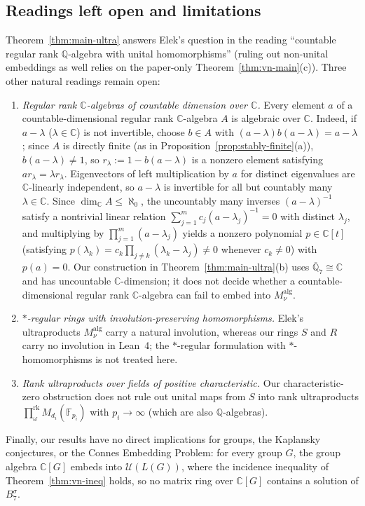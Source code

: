 \documentclass[11pt]{article}
\theoremstyle{definition}
\theoremstyle{remark}
\numberwithin{equation}{section}
\newcommand{\RUF}[3]{\prod_{#1}^{\mathrm{rk}} M_{#2}(#3)}
\newcommand{\Q}{\mathbb{Q}}
\newcommand{\C}{\mathbb{C}}
\newcommand{\F}{\mathbb{F}}
\newcommand{\U}{\mathcal{U}}
\newcommand{\1}{\mathbf{1}}
\begin{document}
\subsection{Readings left open and limitations}
\label{sec:open-readings}

Theorem~\ref{thm:main-ultra} answers Elek's question in the reading ``countable regular rank $\Q$-algebra with unital homomorphisms'' (ruling out non-unital embeddings as well relies on the paper-only Theorem~\ref{thm:vn-main}(c)). Three other natural readings remain open:
\begin{enumerate}[label=\textup{(\arabic*)},leftmargin=2.2em]
\item \emph{Regular rank $\C$-algebras of countable dimension over $\C$.} Every element $a$ of a countable-dimensional regular rank $\C$-algebra $A$ is algebraic over $\C$. Indeed, if $a - \lambda$ ($\lambda \in \C$) is not invertible, choose $b \in A$ with $(a - \lambda)b(a - \lambda) = a - \lambda$; since $A$ is directly finite (as in Proposition~\ref{prop:stably-finite}(a)), $b(a - \lambda) \neq 1$, so $r_\lambda := 1 - b(a - \lambda)$ is a nonzero element satisfying $a r_\lambda = \lambda r_\lambda$. Eigenvectors of left multiplication by $a$ for distinct eigenvalues are $\C$-linearly independent, so $a - \lambda$ is invertible for all but countably many $\lambda \in \C$. Since $\dim_\C A \le \aleph_0$, the uncountably many inverses $(a - \lambda)^{-1}$ satisfy a nontrivial linear relation $\sum_{j=1}^m c_j (a - \lambda_j)^{-1} = 0$ with distinct $\lambda_j$, and multiplying by $\prod_{j=1}^m (a - \lambda_j)$ yields a nonzero polynomial $p \in \C[t]$ (satisfying $p(\lambda_k) = c_k \prod_{j \neq k}(\lambda_k - \lambda_j) \neq 0$ whenever $c_k \neq 0$) with $p(a) = 0$. Our construction in Theorem~\ref{thm:main-ultra}(b) uses $\overline{\Q}_7 \cong \C$ and has uncountable $\C$-dimension; it does not decide whether a countable-dimensional regular rank $\C$-algebra can fail to embed into $M^{\mathrm{alg}}_\nu$.
\item \emph{$*$-regular rings with involution-preserving homomorphisms.} Elek's ultraproducts $M^{\mathrm{alg}}_\nu$ carry a natural involution, whereas our rings $S$ and $R$ carry no involution in Lean~4; the $*$-regular formulation with $*$-homomorphisms is not treated here.
\item \emph{Rank ultraproducts over fields of positive characteristic.} Our characteristic-zero obstruction does not rule out unital maps from $S$ into rank ultraproducts $\RUF{\omega}{d_i}{\F_{p_i}}$ with $p_i \to \infty$ (which are also $\Q$-algebras).
\end{enumerate}
Finally, our results have no direct implications for groups, the Kaplansky conjectures, or the Connes Embedding Problem: for every group $G$, the group algebra $\C[G]$ embeds into $\U(L(G))$, where the incidence inequality of Theorem~\ref{thm:vn-ineq} holds, so no matrix ring over $\C[G]$ contains a solution of $B_7^\sigma$.
\end{document}
